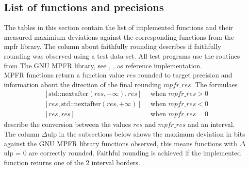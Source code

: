 \documentclass[10pt,a4paper,final,oneside]{article}
\numberwithin{equation}{subsection}
\begin{document}
\subsection{List of functions and precisions}
\label{sub_sec:func_list}
The tables in this section contain the list of implemented functions and
their measured maximium deviations against the corresponding functions
from the mpfr library. The column about faithfully rounding describes if faithfully rounding was observed using a test data set.
All test programs use the routines from The GNU MPFR library, see
\cite{mpfr}, \cite{Fousse:2007:MMB:1236463.1236468}, as reference
implementation.\\[10pt]
MPFR functions return a function value $res$ rounded to target precision
and information about the direction of the final rounding $mpfr\_res$.
The formulaes
\[
    \begin{aligned}
        \left[\text{std::nextafter}(res, -\infty), res\right] &
            \, \text{ when } mpfr\_res > 0 \\
        \left[res, \text{std::nextafter}(res, +\infty)\right] &
            \, \text{ when } mpfr\_res < 0 \\
        \left[res, res\right] &
            \, \text{ when } mpfr\_res = 0
    \end{aligned}
\]
describe the conversion between the values $res$ and $mpfr\_res$
and an interval.\\[10pt]
The column $\Delta$ulp in the subsections below shows the maximum
deviation in bits against the GNU MPFR library functions observed,
this means functions with $\Delta$ulp = 0 are correctly rounded.
Faithful rounding is achieved if the implemented function returns
one of the 2 interval borders.
%
%
\end{document}
